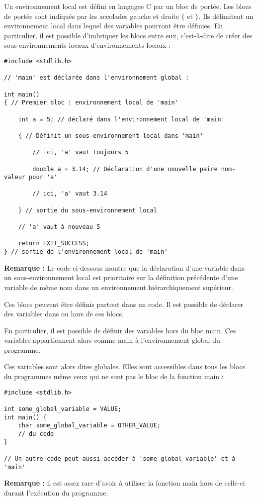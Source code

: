 \documentclass[../../../main.tex]{subfiles}
\begin{document}
Un environnement local est défini en langagee C par un bloc de portée. Les blocs de portée sont indiqués par les accolades gauche et droite $\{$ et $\}$. Ils délimitent un environnement local dans lequel des variables pourront être définies. En particulier, il est possible d'imbriquer les blocs entre eux, c'est-à-dire de créer des sous-environnements locaux d'environnements locaux :
\begin{verbatim}
#include <stdlib.h>

// 'main' est déclarée dans l'environnement global :

int main()
{ // Premier bloc : environnement local de 'main'

	int a = 5; // déclaré dans l'environnement local de 'main'

	{ // Définit un sous-environnement local dans 'main'

		// ici, 'a' vaut toujours 5
		
		double a = 3.14; // Déclaration d'une nouvelle paire nom-valeur pour 'a'
		
		// ici, 'a' vaut 3.14
	
	} // sortie du sous-environnement local

	// 'a' vaut à nouveau 5
	
	return EXIT_SUCCESS;
} // sortie de l'environnement local de 'main'

\end{verbatim}
\textbf{Remarque :} Le code ci-dessous montre que la déclaration d'une variable dans un sous-environnement local est prioritaire sur la définition précédente d'une variable de même nom dans un environnement hiérarchiquement supérieur.

Ces blocs peuvent être définis partout dans un code. Il est possible de déclarer des variables dans ou hors de ces blocs.
 
En particulier, il est possible de définir des variables hors du bloc \textsf{main}. Ces variables appartiennent alors comme \textsf{main} à l'environnement global du programme.

Ces variables sont alors dites globales. Elles sont accessibles dans tous les blocs du programmes même ceux qui ne sont pas le bloc de la fonction \textsf{main} :
\begin{verbatim}
#include <stdlib.h>

int some_global_variable = VALUE;
int main() {
	char some_global_variable = OTHER_VALUE;
	// du code
}

// Un autre code peut aussi accéder à 'some_global_variable' et à 'main'
\end{verbatim}
\textbf{Remarque :} il est assez rare d'avoir à utiliser la fonction \textsf{main} hors de celle-ci durant l'exécution du programme.
\end{document}
